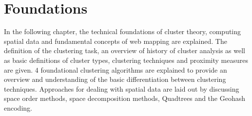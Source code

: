 
%
%

\chapter{Foundations}
\label{chapter:foundations}

In the following chapter, the technical foundations of cluster theory, computing spatial data and fundamental concepts of web mapping are explained. The definition of the clustering task, an overview of history of cluster analysis as well as basic definitions of cluster types, clustering techniques and proximity measures are given. 4 foundational clustering algorithms are explained to provide an overview and understanding of the basic differentiation between clustering techniques. Approaches for dealing with spatial data are laid out by discussing space order methods, space decomposition methods, Quadtrees and the Geohash encoding.










